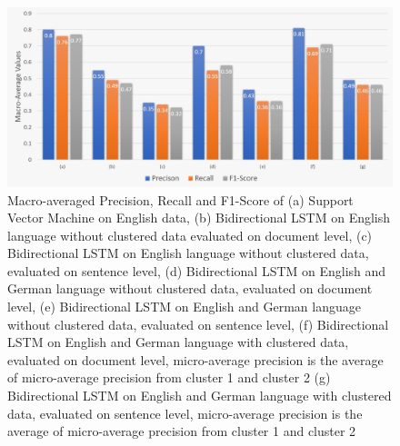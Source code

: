 \begin{figure}[!ht]
    \centering
    \includegraphics[width=16cm, keepaspectratio]{pics/EvaluationQ1.jpeg}
    \caption{Macro-averaged Precision, Recall and F1-Score of (a) Support Vector Machine on English data, (b) Bidirectional LSTM on English language without clustered data evaluated on document level, (c) Bidirectional LSTM on English language without clustered data, evaluated on sentence level, (d) Bidirectional LSTM on English and German language without clustered data, evaluated on document level, (e)
    Bidirectional LSTM on English and German language without clustered data, evaluated on sentence level, (f)
    Bidirectional LSTM on English and German language with clustered data, evaluated on document level, micro-average precision is the average of micro-average precision from cluster 1 and cluster 2  (g) Bidirectional LSTM on English and German language with clustered data, evaluated on sentence level, micro-average precision is the average of micro-average precision from cluster 1 and cluster 2}
    \label{fig:my_label}
\end{figure}
